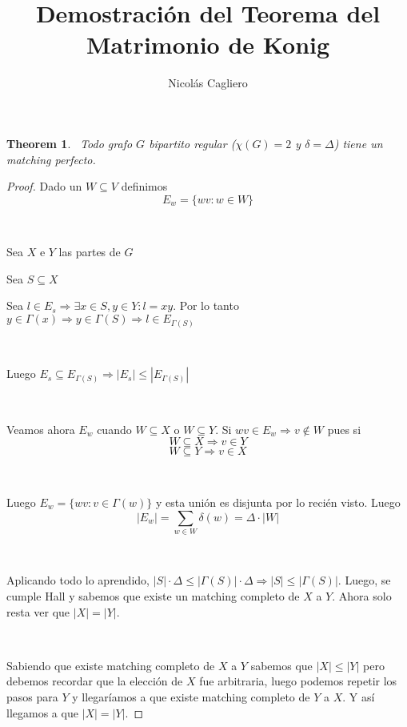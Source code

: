 \documentclass[11pt]{article}
\title{Demostración del Teorema del Matrimonio de Konig}
\author{Nicolás Cagliero}
\newtheorem{theorem}{Theorem}
\begin{document}
\maketitle
\begin{theorem}\par
\
Todo grafo $G$ bipartito regular ($\chi(G) = 2$ y $\delta = \Delta$) tiene un matching perfecto.
\

\end{theorem}

\begin{proof} Dado un $W \subseteq V$ definimos \[E_w = \{wv: w \in W\}\] \par
\

Sea $X$ e $Y$ las partes de $G$\par
Sea $S \subseteq X$\par
Sea $l \in E_s \Rightarrow \exists x \in S, y \in Y: l = xy$. Por lo tanto $y \in \Gamma(x) \Rightarrow y \in \Gamma(S) \Rightarrow l \in E_{\Gamma(S)}$\par
\

Luego $E_s \subseteq E_{\Gamma(S)} \Rightarrow |E_s| \le |E_{\Gamma(S)}|$\par
\

Veamos ahora $E_w$ cuando $W \subseteq X$ o $W \subseteq Y$. Si $wv \in E_w \Rightarrow v \notin W$ pues si \[W \subseteq X \Rightarrow v \in Y\] \[W \subseteq Y \Rightarrow v \in X\] \par
\

Luego $E_w = \{wv: v \in \Gamma(w)\}$ y esta unión es disjunta por lo recién visto. Luego \[|E_w| = \sum_{w \in W} \delta(w) = \Delta \cdot |W|\]\par
\

Aplicando todo lo aprendido, $|S| \cdot \Delta \le |\Gamma(S)| \cdot \Delta \Rightarrow |S| \le |\Gamma(S)|$. Luego, se cumple Hall y sabemos que existe un matching completo de $X$ a $Y$. Ahora solo resta ver que $|X| = |Y|$.\par
\

Sabiendo que existe matching completo de $X$ a $Y$ sabemos que $|X| \le |Y|$ pero debemos recordar que la elección de $X$ fue arbitraria, luego podemos repetir los pasos para $Y$ y llegaríamos a que existe matching completo de $Y$ a $X$. Y así llegamos a que $|X| = |Y|$.


\end{proof}
\end{document}
